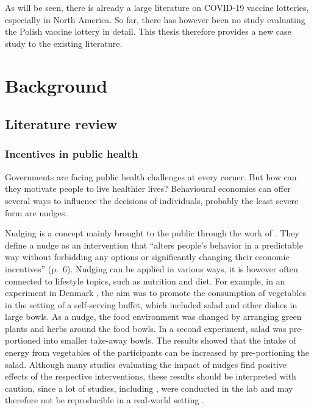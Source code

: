 \documentclass{scrbook}
\begin{document}
As will be seen, there is already a large literature on COVID-19 vaccine
lotteries, especially in North America. So far, there has however been
no study evaluating the Polish vaccine lottery in detail. This thesis
therefore provides a new case study to the existing literature.

\chapter{Background}

\section{Literature review}

\subsection{Incentives in public health}

Governments are facing public health challenges at every corner. But how
can they motivate people to live healthier lives? Behavioural economics
can offer several ways to influence the decisions of individuals,
probably the least severe form are nudges.

Nudging is a concept mainly brought to the public through the work of
\textcite{thaler_nudge_2008}. They define a nudge as an intervention
that ``alters people's behavior in a predictable way without forbidding
any options or significantly changing their economic incentives''
(p.~6). Nudging can be applied in various ways, it is however often
connected to lifestyle topics, such as nutrition and diet. For example,
in an experiment in Denmark \parencite{friis_comparison_2017}, the aim
was to promote the consumption of vegetables in the setting of a
self-serving buffet, which included salad and other dishes in large
bowls. As a nudge, the food environment was changed by arranging green
plants and herbs around the food bowls. In a second experiment, salad
was pre-portioned into smaller take-away bowls. The results showed that
the intake of energy from vegetables of the participants can be
increased by pre-portioning the salad. Although many studies evaluating
the impact of nudges find positive effects of the respective
interventions, these results should be interpreted with caution, since a
lot of studies, including \textcite{friis_comparison_2017}, were
conducted in the lab and may therefore not be reproducible in a
real-world setting \parencite{ledderer_nudging_2020}.
\end{document}

